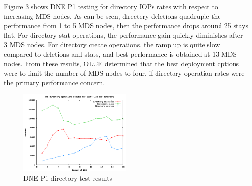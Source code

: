 \documentclass[conference,compsoc]{IEEEtran}
\begin{document}
%
%

Figure 3 shows DNE P1 testing for directory IOPs rates with respect to
increasing MDS nodes. As can be seen, directory deletions quadruple the
performance from 1 to 5 MDS nodes, then the performance drops around 25%
stays flat. For directory stat operations, the performance gain quickly
diminishes after 3 MDS nodes. For directory create operations, the ramp up is
quite slow compared to deletions and stats, and best performance is obtained at
13 MDS nodes. From these results, OLCF determined that the best deployment
options were to limit the number of MDS nodes to four, if directory operation
rates were the primary performance concern.


\begin{figure}[!ht]
  \centering
    \includegraphics[width=0.5\textwidth]{figs/dnep1_dir_results}
  \caption{DNE P1 directory test results}
\end{figure}
\end{document}
